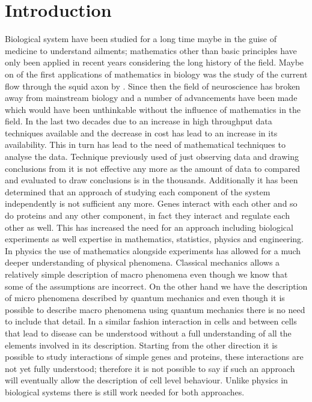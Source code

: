 \chapter{Introduction}
\label{cha:introduction}

Biological system have been studied for a long time maybe in the guise of medicine to understand ailments; mathematics other  than basic principles have only been applied in recent years considering the long history of the field. Maybe on of the first applications of mathematics in biology was the study of the current flow through the squid axon by \cite{Hodgkin:1952td}. Since then the field of neuroscience has broken away from mainstream biology and a number of advancements have been made which would have been unthinkable without the influence of mathematics in the field. In the last two decades due to an increase in high throughput data techniques available and the decrease in cost has lead to an increase in its availability. This in turn has lead to the need of mathematical techniques to analyse the data. Technique previously used of just observing data and drawing conclusions from it is not effective any more as the amount of data to compared and evaluated to draw conclusions is in the thousands. Additionally it has been determined that an approach of studying each component of the system independently is not sufficient any more. Genes interact with each other and so do proteins and any other component, in fact they interact and regulate each other as well. This has increased the need for an approach including biological experiments as well expertise in mathematics, statistics, physics and engineering. In physics the use of mathematics alongside experiments has allowed for a much deeper understanding of physical phenomena. Classical mechanics allows a relatively simple description of macro phenomena even though we know that some of the assumptions are incorrect. On the other hand we have the description of micro phenomena described by quantum mechanics and even though it is possible to describe macro phenomena using quantum mechanics there is no need to include that detail. In a similar fashion interaction in cells and between cells that lead to disease can be understood without a full understanding of all the elements involved in its description. Starting from the other direction it is possible to study interactions of simple genes and proteins, these interactions are not yet fully understood; therefore it is not possible to say if such an approach will eventually allow the description of cell level behaviour. Unlike physics in biological systems there is still work needed for both approaches.

